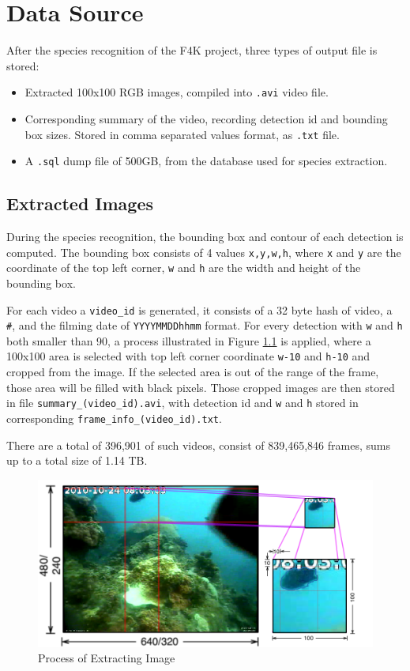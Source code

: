 \documentclass[bsc,logo,twoside,fullspacing,parskip]{infthesis}
\begin{document}
\newpage

\chapter{Data Source}
\label{sec:datasource}

After the species recognition of the F4K project, three types of output file is stored:
\begin{itemize}
\item
Extracted 100x100 RGB images, compiled into {\tt .avi} video file.
\item
Corresponding summary of the video, recording detection id and bounding box sizes. Stored in comma separated values format, as {\tt .txt} file.
\item
A {\tt .sql} dump file of 500GB, from the database used for species extraction.
\end{itemize}

\section{Extracted Images}
\label{sec:summaries}

During the species recognition, the bounding box and contour of each detection is computed.
The bounding box consists of 4 values {\tt x,y,w,h}, where {\tt x} and {\tt y} are the coordinate of the top left corner, {\tt w} and {\tt h} are the width and height of the bounding box. 

For each video a {\tt video\_id} is generated, it consists of a 32 byte hash of video, a {\tt \#}, and the filming date of {\tt YYYYMMDDhhmm} format. 
For every detection with {\tt w} and {\tt h} both smaller than 90, a process illustrated in Figure \ref{fig:extraction} is applied, where a 100x100 area is selected with top left corner coordinate {\tt w-10} and {\tt h-10} and cropped from the image. 
If the selected area is out of the range of the frame, those area will be filled with black pixels.
Those cropped images are then stored in file {\tt summary\_(video\_id).avi}, with detection id and {\tt w} and {\tt h} stored in corresponding {\tt frame\_info\_(video\_id).txt}.

There are a total of 396,901 of such videos, consist of 839,465,846 frames, sums up to a total size of 1.14 TB.

\begin{figure}
    \centering
    \includegraphics[scale=0.3]{graph/extraction.png}
    \caption{Process of Extracting Image}
    \label{fig:extraction}
\end{figure}
\end{document}
